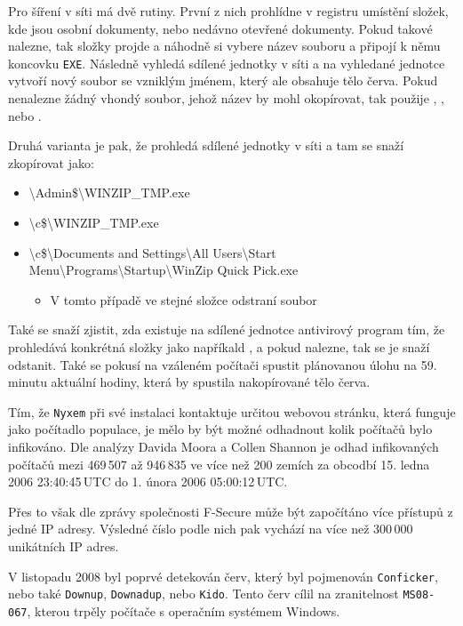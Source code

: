 \documentclass[a4paper,12pt]{article}
\begin{document}
Pro šíření v síti má dvě rutiny. První z nich prohlídne v registru umístění složek, kde jsou osobní dokumenty, nebo nedávno otevřené dokumenty. Pokud takové nalezne, tak složky projde a náhodně si vybere název souboru a připojí k němu koncovku \texttt{EXE}. Následně vyhledá sdílené jednotky v síti a na vyhledané jednotce vytvoří nový soubor se vzniklým jménem, který ale obsahuje tělo červa. Pokud nenalezne žádný vhondý soubor, jehož název by mohl okopírovat, tak použije , , nebo .\cite{nyxem-fsecure}

Druhá varianta je pak, že prohledá sdílené jednotky v síti a tam se snaží zkopírovat jako:
\begin{itemize}
	\item \textbackslash Admin\$\textbackslash WINZIP\_TMP.exe
	\item \textbackslash c\$\textbackslash WINZIP\_TMP.exe
	\item \textbackslash c\$\textbackslash Documents and Settings\textbackslash All Users\textbackslash Start Menu\textbackslash Programs\textbackslash Startup\textbackslash WinZip Quick Pick.exe
	\begin{itemize}
		\item V tomto případě ve stejné složce odstraní soubor 
	\end{itemize}
\end{itemize}
Také se snaží zjistit, zda existuje na sdílené jednotce antivirový program tím, že prohledává konkrétná složky jako napříkald , a pokud nalezne, tak se je snaží odstanit. Také se pokusí na vzáleném počítači spustit plánovanou úlohu na 59. minutu aktuální hodiny, která by spustila nakopírované tělo červa.\cite{nyxem-fsecure}

Tím, že \texttt{Nyxem} při své instalaci kontaktuje určitou webovou stránku, která funguje jako počítadlo populace, je mělo by být možné odhadnout kolik počítačů bylo infikováno. Dle analýzy Davida Moora a Collen Shannon je odhad infikovaných počítačů mezi 469\,507 až 946\,835 ve více než 200 zemích za obcodbí 15. ledna 2006 23:40:45\,UTC do 1. února 2006 05:00:12\,UTC.\cite{nyxem-caida}

Přes to však dle zprávy společnosti F-Secure může být započítáno více přístupů z jedné IP adresy. Výsledné číslo podle nich pak vychází na více než 300\,000 unikátních IP adres.\cite{nyxem-fsecure}

V listopadu 2008 byl poprvé detekován červ, který byl pojmenován \texttt{Conficker}, nebo také \texttt{Downup}, \texttt{Downadup}, nebo \texttt{Kido}. Tento červ cílil na zranitelnost \texttt{MS08-067}, kterou trpěly počítače s operačním systémem Windows.\cite{conficker-wiki}
\end{document}
